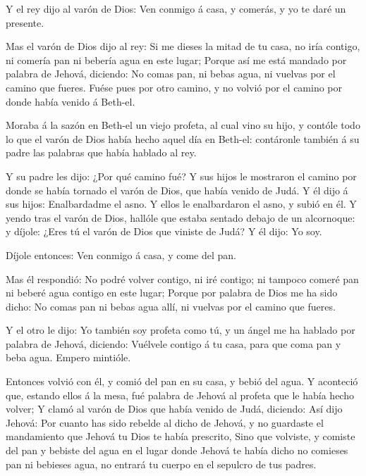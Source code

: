  Y el rey dijo al varón de Dios: Ven conmigo á casa, y
comerás, y yo te daré un presente.

 Mas el varón de Dios dijo al rey: Si me dieses la mitad de
tu casa, no iría contigo, ni comería pan ni bebería agua en este lugar;
 Porque así me está mandado por palabra de Jehová, diciendo:
No comas pan, ni bebas agua, ni vuelvas por el camino que fueres.
 Fuése pues por otro camino, y no volvió por el camino por
donde había venido á Beth-el.

 Moraba á la sazón en Beth-el un viejo profeta, al cual
vino su hijo, y contóle todo lo que el varón de Dios había hecho aquel
día en Beth-el: contáronle también á su padre las palabras que había
hablado al rey.

 Y su padre les dijo: ¿Por qué camino fué? Y sus hijos le
mostraron el camino por donde se había tornado el varón de Dios, que
había venido de Judá.  Y él dijo á sus hijos: Enalbardadme
el asno. Y ellos le enalbardaron el asno, y subió en él.  Y
yendo tras el varón de Dios, hallóle que estaba sentado debajo de un
alcornoque: y díjole: ¿Eres tú el varón de Dios que viniste de Judá? Y
él dijo: Yo soy.

 Díjole entonces: Ven conmigo á casa, y come del pan.

 Mas él respondió: No podré volver contigo, ni iré contigo;
ni tampoco comeré pan ni beberé agua contigo en este lugar;
 Porque por palabra de Dios me ha sido dicho: No comas pan
ni bebas agua allí, ni vuelvas por el camino que fueres.

 Y el otro le dijo: Yo también soy profeta como tú, y un
ángel me ha hablado por palabra de Jehová, diciendo: Vuélvele contigo á
tu casa, para que coma pan y beba agua. Empero mintióle.

 Entonces volvió con él, y comió del pan en su casa, y
bebió del agua.  Y aconteció que, estando ellos á la mesa,
fué palabra de Jehová al profeta que le había hecho volver;
 Y clamó al varón de Dios que había venido de Judá,
diciendo: Así dijo Jehová: Por cuanto has sido rebelde al dicho de
Jehová, y no guardaste el mandamiento que Jehová tu Dios te había
prescrito,  Sino que volviste, y comiste del pan y bebiste
del agua en el lugar donde Jehová te había dicho no comieses pan ni
bebieses agua, no entrará tu cuerpo en el sepulcro de tus padres.

